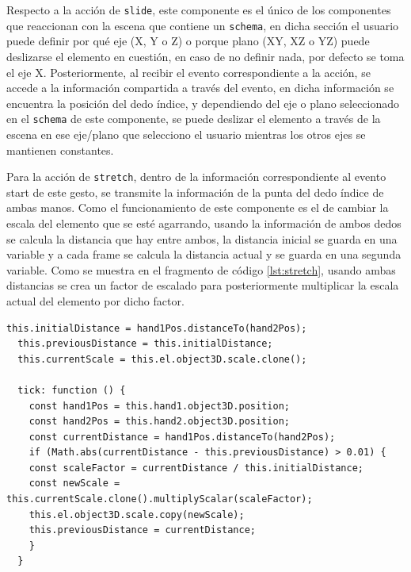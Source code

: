 \documentclass[a4paper, 12pt]{book}
\begin{document}
Respecto a la acción de \texttt{slide}, este componente es el único de los componentes que reaccionan con la escena que contiene un \texttt{schema}, en dicha sección el usuario puede definir por qué eje (X, Y o Z) o porque plano (XY, XZ o YZ) puede deslizarse el elemento en cuestión, en caso de no definir nada, por defecto se toma el eje X. Posteriormente, al recibir el evento correspondiente a la acción, se accede a la información compartida a través del evento, en dicha información se encuentra la posición del dedo índice, y dependiendo del eje o plano seleccionado en el \texttt{schema} de este componente, se puede deslizar el elemento a través de la escena en ese eje/plano que selecciono el usuario mientras los otros ejes se mantienen constantes.

Para la acción de \texttt{stretch}, dentro de la información correspondiente al evento start de este gesto, se transmite la información de la punta del dedo índice de ambas manos. Como el funcionamiento de este componente es el de cambiar la escala del elemento que se esté agarrando, usando la información de ambos dedos se calcula la distancia que hay entre ambos, la distancia inicial se guarda en una variable y a cada frame se calcula la distancia actual y se guarda en una segunda variable. Como se muestra en el fragmento de código \ref{lst:stretch}, usando ambas distancias se crea un factor de escalado para posteriormente multiplicar la escala actual del elemento por dicho factor.
\begin{lstlisting}[caption=Actualización del factor de escala, captionpos=b, label=lst:stretch]
  this.initialDistance = hand1Pos.distanceTo(hand2Pos);
  this.previousDistance = this.initialDistance;
  this.currentScale = this.el.object3D.scale.clone();

  tick: function () {  
    const hand1Pos = this.hand1.object3D.position;
    const hand2Pos = this.hand2.object3D.position;
    const currentDistance = hand1Pos.distanceTo(hand2Pos);
    if (Math.abs(currentDistance - this.previousDistance) > 0.01) {
    const scaleFactor = currentDistance / this.initialDistance;
    const newScale = this.currentScale.clone().multiplyScalar(scaleFactor);
    this.el.object3D.scale.copy(newScale);
    this.previousDistance = currentDistance;
    }
  }
\end{lstlisting}
\end{document}
